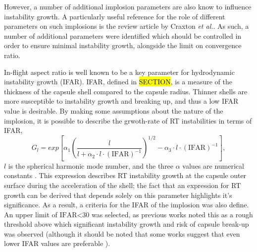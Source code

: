 
However, a number of additional implosion parameters are also know to influence instability growth. A particularly useful reference for the role of different parameters on such implosions is the review article by Craxton \textit{et al.}\cite{Craxton2015}. As such, a number of additional parameters were identified which should be controlled in order to ensure minimal instability growth, alongside the limit on convergence ratio.

In-flight aspect ratio is well known to be a key parameter for hydrodynamic instability growth (IFAR). IFAR, defined in \hl{SECTION}, is a measure of the thickness of the capsule shell compared to the capsule radius. Thinner shells are more susceptible to instability growth and breaking up, and thus a low IFAR value is desirable. By making some assumptions about the nature of the implosion, it is possible to describe the grwoth-rate of RT instabilities in terms of IFAR, 
\begin{equation} G_l = exp \left[ \alpha_1 \left( \frac{l}{l + \alpha_2 \cdot l \cdot (\mathrm{IFAR})^{-1}} \right)^{1/2} - \alpha_3 \cdot l \cdot (\mathrm{IFAR})^{-1} \right], \label{eq: IFARGrowth} \end{equation} $l$ is the spherical harmonic mode number, and the three $\alpha$ values are numerical constants \cite{Atzeni2008}. This expression describes RT instability growth at the capsule outer surface during the acceleration of the shell; the fact that an expression for RT growth can be derived that depends solely on this parameter highlights it's significance. As a result, a criteria for the IFAR of the implosion was also define. An upper limit of $\textrm{IFAR<30}$ was selected, as previous works noted this as a rough threshold above which significant instability growth and risk of capsule break-up was observed \cite{Lindl1995} (although it should be noted that some works suggest that even lower IFAR values are preferable \cite{Radha2011, Goncharov2003}).

